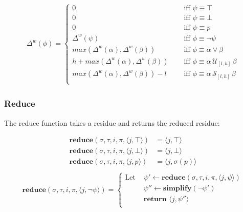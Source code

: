 \documentclass[10pt,a4paper]{article}
\newcommand{\rp}[2]{\ensuremath{\langle #1, #2 \rangle}}
\begin{document}

\begin{align*}
\Delta^w(\phi) = \left\lbrace
\begin{aligned}
0 & \quad \text{ iff } \psi \equiv \top \\
0 & \quad \text{ iff } \psi \equiv \bot \\
0 & \quad \text{ iff } \psi \equiv p \\
\Delta^w(\psi) & \quad \text{ iff } \phi \equiv \neg \psi \\
max(\Delta^w(\alpha),\Delta^w(\beta)) & \quad \text{ iff } \phi \equiv \alpha \vee \beta \\
h + max(\Delta^w(\alpha),\Delta^w(\beta)) & \quad \text{ iff } \phi \equiv \alpha\, \mathcal{U}_{[l,h]}\, \beta \\
max(\Delta^w(\alpha),\Delta^w(\beta)) - l & \quad \text{ iff } \phi \equiv \alpha\, \mathcal{S}_{[l,h]}\, \beta \\
\end{aligned} \right. 
\end{align*}

\subsubsection*{Reduce}
The reduce function takes a residue and returns the reduced residue:


\begin{align*}
\mathbf{reduce}(\sigma,\tau, i,\pi,\rp{j}{\top}) &= \rp{j}{\top} \\
\mathbf{reduce}(\sigma,\tau, i,\pi,\rp{j}{\bot}) &= \rp{j}{\bot} \\
\mathbf{reduce}(\sigma,\tau, i,\pi,\rp{j}{p}) &= \rp{j}{\sigma(p)} \\
\end{align*}
\begin{align*}
\mathbf{reduce}(\sigma,\tau, i,\pi,\rp{j}{\neg \psi}) = \left\{
\begin{aligned}
\text{Let } &\psi' \leftarrow \mathbf{reduce}(\sigma, \tau, i, \pi, \rp{j}{\psi}) \\
&\psi'' \leftarrow \mathbf{simplify}(\neg \psi') \\
&\textbf{return } \rp{j}{\psi''} \\
\end{aligned} \right. \\
\end{align*}
\end{document}

